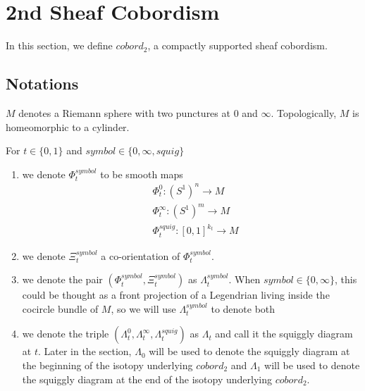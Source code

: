 \section{2nd Sheaf Cobordism}
In this section, we define $cobord_2$, a compactly supported sheaf cobordism.
\subsection{Notations}
\begin{definition}
$M$ denotes a Riemann sphere with two punctures at $0$ and $\infty$. Topologically, $M$ is homeomorphic to a cylinder.
\end{definition}
\begin{definition}
For $t\in\{0,1\}$ and $symbol\in\{0,\infty, squig \}$
\begin{enumerate}
\item we denote $\Phi_t^{symbol}$ to be smooth maps
\begin{align*}
&\Phi_t^0 : (S^1)^n \rightarrow M \\
&\Phi_t^\infty : (S^1)^m \rightarrow M \\
&\Phi_t^{squig} : [0,1]^{k_t} \rightarrow M
\end{align*}

\item we denote $\Xi_t^{symbol}$ a co-orientation of $\Phi_t^{symbol}$.

\item we denote the pair $(\Phi_t^{symbol},\Xi_t^{symbol})$ as $\Lambda_t^{symbol}$. When $symbol \in \{0,\infty\}$, this could be thought as a front projection of a Legendrian living inside the cocircle bundle of $M$, so we will use $\Lambda_t^{symbol}$ to denote both

\item we denote the triple $(\Lambda_t^{0},\Lambda_t^{\infty},\Lambda_t^{squig})$ as $\Lambda_t$ and call it the squiggly diagram at $t$. Later in the section, $\Lambda_0$ will be used to denote the squiggly diagram at the beginning of the isotopy underlying $cobord_2$ and $\Lambda_1$ will be used to denote the squiggly diagram at the end of the isotopy underlying $cobord_2$. 
\end{enumerate}
\end{definition}

